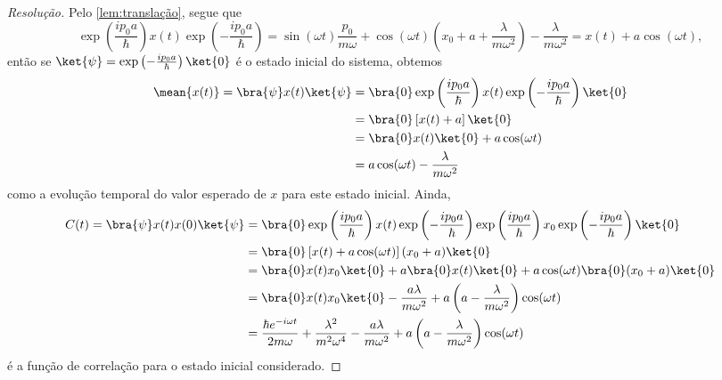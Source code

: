 \begin{proof}[Resolução]
    Pelo \cref{lem:translação}, segue que
    \begin{equation*}
        \exp\left(\frac{i p_0 a}{\hbar}\right)x(t) \exp\left(-\frac{i p_0 a}{\hbar}\right) = \sin(\omega t) \frac{p_0}{m \omega}+ \cos(\omega t) \left(x_0 + a + \frac{\lambda}{m \omega^2}\right) - \frac{\lambda}{m \omega^2} = x(t) + a \cos(\omega t),
    \end{equation*}
    então se \(\ket{\psi} = \exp\left(-\frac{i p_0 a}{\hbar}\right)\ket{0}\) é o estado inicial do sistema, obtemos
    \begin{align*}
        \mean{x(t)} = \bra{\psi}x(t)\ket{\psi} &= \bra{0} \exp\left(\frac{i p_0 a}{\hbar}\right) x(t) \exp\left(-\frac{i p_0 a}{\hbar}\right)\ket{0}\\
                                               &= \bra{0} \left[x(t) + a\right]\ket{0}\\
                                               &= \bra{0} x(t) \ket{0} + a \cos(\omega t)\\
                                               &= a \cos(\omega t) - \frac{\lambda}{m \omega^2}
    \end{align*}
    como a evolução temporal do valor esperado de \(x\) para este estado inicial. Ainda,
    \begin{align*}
        C(t) = \bra{\psi}x(t) x(0)\ket{\psi} &= \bra{0} \exp\left(\frac{i p_0 a}{\hbar}\right) x(t) \exp\left(-\frac{i p_0 a}{\hbar}\right) \exp\left(\frac{i p_0 a}{\hbar}\right) x_0 \exp\left(-\frac{i p_0 a}{\hbar}\right)\ket{0}\\
                                             &= \bra{0} \left[x(t) + a \cos(\omega t)\right](x_0 + a)\ket{0}\\
                                             &= \bra{0} x(t) x_0 \ket{0} + a \bra{0} x(t) \ket{0} + a \cos(\omega t) \bra{0} (x_0 + a) \ket{0}\\
                                             &= \bra{0}x(t) x_0 \ket{0} - \frac{a\lambda}{m \omega^2} + a \left(a - \frac{\lambda}{m \omega^2}\right) \cos(\omega t)\\
                                             &= \frac{\hbar e^{- i \omega t}}{ 2 m \omega} + \frac{\lambda^2}{m^2 \omega^4} - \frac{a \lambda}{m \omega^2} + a \left(a - \frac{\lambda}{m \omega^2}\right)\cos(\omega t)
    \end{align*}
    é a função de correlação para o estado inicial considerado.
\end{proof}
